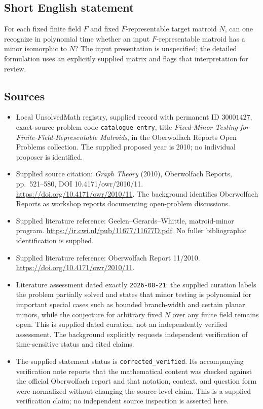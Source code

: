 \documentclass[11pt]{article}
\begin{document}
\subsection{Short English statement}
For each fixed finite field \(F\) and fixed \(F\)-representable target matroid \(N\), can one recognize in polynomial time whether an input \(F\)-representable matroid has a minor isomorphic to \(N\)? The input presentation is unspecified; the detailed formulation uses an explicitly supplied matrix and flags that interpretation for review.
\subsection{Sources}
\begin{itemize}
\item Local UnsolvedMath registry, supplied record with permanent ID \(30001427\), exact source problem code \texttt{catalogue entry}, title \emph{Fixed-Minor Testing for Finite-Field-Representable Matroids}, in the Oberwolfach Reports Open Problems collection. The supplied proposed year is 2010; no individual proposer is identified.
\item Supplied source citation: \emph{Graph Theory} (2010), Oberwolfach Reports, pp.\ 521--580, DOI 10.4171/owr/2010/11. \url{https://doi.org/10.4171/owr/2010/11}. The background identifies Oberwolfach Reports as workshop reports documenting open-problem discussions.
\item Supplied literature reference: Geelen--Gerards--Whittle, matroid-minor program. \url{https://ir.cwi.nl/pub/11677/11677D.pdf}. No fuller bibliographic identification is supplied.
\item Supplied literature reference: Oberwolfach Report 11/2010. \url{https://doi.org/10.4171/owr/2010/11}.
\item Literature assessment dated exactly \texttt{2026-08-21}: the supplied curation labels the problem partially solved and states that minor testing is polynomial for important special cases such as bounded branch-width and certain planar minors, while the conjecture for arbitrary fixed \(N\) over any finite field remains open. This is supplied dated curation, not an independently verified assessment. The background explicitly requests independent verification of time-sensitive status and cited claims.
\item The supplied statement status is \texttt{corrected\_verified}. Its accompanying verification note reports that the mathematical content was checked against the official Oberwolfach report and that notation, context, and question form were normalized without changing the source-level claim. This is a supplied verification claim; no independent source inspection is asserted here.
\end{itemize}
\end{document}
